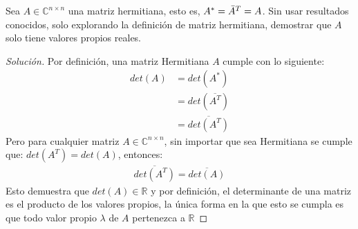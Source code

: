 \documentclass[12pt]{book}
\newcommand{\C}{\mathbb{C}}
\newcommand{\R}{\mathbb{R}}
\newenvironment{solucion}
  {\renewcommand\qedsymbol{$\square$}\begin{proof}[Solución]}
  {\end{proof}}
\begin{document}
\eje Sea $A\in\C^{n\times n}$ una matriz hermitiana, esto es, $A^*=\Bar{A}^T=A$. Sin usar resultados conocidos, solo explorando la definición de matriz hermitiana, demostrar que $A$ solo tiene valores propios reales.
\begin{solucion}
Por definición, una matriz Hermitiana $A$ cumple con lo siguiente: 
\begin{align*}
    det(A)&=det(A^*)\\
    &= det (\overline{A^T})\\
    &= \overline{det(A^T)}
\end{align*}
Pero para cualquier matriz $A\in\C^{n\times n}$, sin importar que sea Hermitiana se cumple que: $det(A^T)=det(A)$, entonces:
\begin{align*}
    \overline{det(A^T)}=\overline{det(A)}
\end{align*}
Esto demuestra que $det(A)\in \R$ y por definición, el determinante de una matriz es el producto de los valores propios, la única forma en la que esto se cumpla es que todo valor propio $\lambda$ de $A$ pertenezca a $\R$
\end{solucion}
\end{document}
